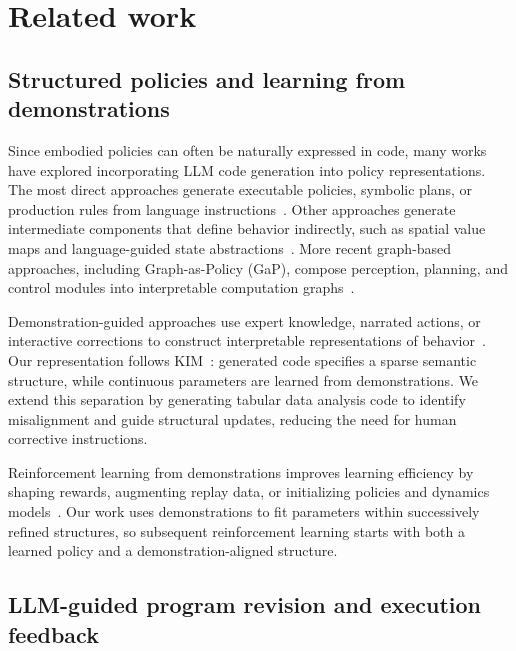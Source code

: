 \section{Related work}
\label{sec:related}

\subsection{Structured policies and learning from demonstrations}
\label{sec:related-structured}

Since embodied policies can often be naturally expressed in code, many works have explored incorporating LLM code generation into policy representations.
The most direct approaches generate executable policies, symbolic plans, or production rules from language instructions~\citep{liang2022code,liu2023llm+,kirk2024improving}.
Other approaches generate intermediate components that define behavior indirectly, such as spatial value maps and language-guided state abstractions~\citep{huang2023voxposer,peng2024learning,peng2024adaptive}.
More recent graph-based approaches, including Graph-as-Policy (GaP), compose perception, planning, and control modules into interpretable computation graphs~\citep{chen2026gap}.

Demonstration-guided approaches use expert knowledge, narrated actions, or interactive corrections to construct interpretable representations of behavior~\citep{zhu2025sample,kim2025interactiveprogramsynthesismodeling,zhu2026interpret}.
Our representation follows KIM~\citep{zhu2025sample}: generated code specifies a sparse semantic structure, while continuous parameters are learned from demonstrations.
We extend this separation by generating tabular data analysis code to identify misalignment and guide structural updates, reducing the need for human corrective instructions.

Reinforcement learning from demonstrations improves learning efficiency by shaping rewards, augmenting replay data, or initializing policies and dynamics models~\citep{brys2015reinforcement,hester2018deep,uchendu2023jump,hansen2022modem}.
Our work uses demonstrations to fit parameters within successively refined structures, so subsequent reinforcement learning starts with both a learned policy and a demonstration-aligned structure.

\subsection{LLM-guided program revision and execution feedback}
\label{sec:related-refinement}

